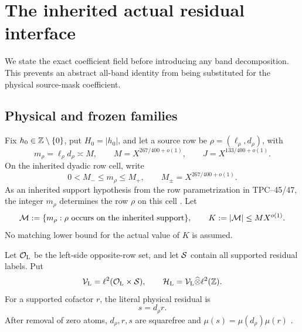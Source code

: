\section{The inherited actual residual interface}
\label{sec:tpc48-interface}

We state the exact coefficient field before introducing any band
decomposition.  This prevents an abstract all-band identity from being
substituted for the physical source-mask coefficient.

\subsection{Physical and frozen families}

Fix \(h_0\in\mathbb Z\setminus\{0\}\), put \(H_0=|h_0|\), and let a source
row be \(\rho=(\ell_\rho,d_\rho)\), with
\begin{equation}
 m_\rho=\ell_\rho d_\rho\asymp M,
 \qquad
 M=X^{267/400+o(1)},
 \qquad
 J=X^{133/400+o(1)}.
 \label{eq:tpc48-row-scales}
\end{equation}
On the inherited dyadic row cell, write
\begin{equation}
 0<M_-\le m_\rho\le M_+,
 \qquad M_\pm=X^{267/400+o(1)}.
 \label{eq:tpc48-source-interval}
\end{equation}
As an inherited support hypothesis from the row parametrization in
TPC--45/47, the integer \(m_\rho\) determines the row \(\rho\) on this
cell \citep{WangTPC45,WangTPC47}.
Let
\begin{equation}
 \mathcal M:=\{m_\rho:\rho\text{ occurs on the inherited support}\},
 \qquad K:=|\mathcal M|\le MX^{o(1)}.
 \label{eq:tpc48-supported-slopes}
\end{equation}
No matching lower bound for the actual value of \(K\) is assumed.

Let \(\mathcal O_{\mathrm L}\) be the left-side opposite-row set, and let
\(\mathcal S\) contain all
supported residual labels.  Put
\begin{equation}
 \mathcal V_{\mathrm L}=\ell^2(\mathcal O_{\mathrm L}\times\mathcal S),
 \qquad
 \mathcal H_{\mathrm L}=\mathcal V_{\mathrm L}\widehat\otimes\ell^2(\mathbb Z).
 \label{eq:tpc48-output-space}
\end{equation}
For a supported cofactor \(r\), the literal physical residual is
\begin{equation}
 s=d_\rho r.
 \label{eq:tpc48-residual-label}
\end{equation}
After removal of zero atoms, \(d_\rho,r,s\) are squarefree and
\(\mu(s)=\mu(d_\rho)\mu(r)\)
\citep{WangTPC43,WangTPC45,WangTPC46}.

